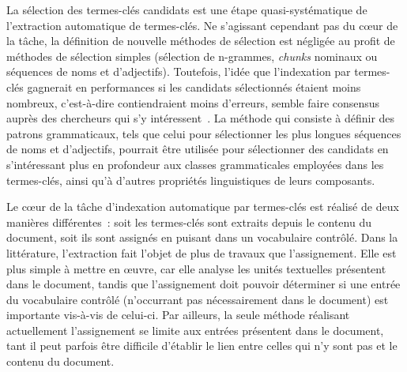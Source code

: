     La sélection des termes-clés candidats est une étape quasi-systématique de
    l'extraction automatique de termes-clés. Ne s'agissant cependant pas du
    c\oe{}ur de la tâche, la définition de nouvelle méthodes de sélection est
    négligée au profit de méthodes de sélection simples (sélection de n-grammes,
    \textit{chunks} nominaux ou séquences de noms et d'adjectifs). Toutefois,
    l'idée que l'indexation par termes-clés gagnerait en performances si les
    candidats sélectionnés étaient moins nombreux, c'est-à-dire contiendraient
    moins d'erreurs, semble faire consensus auprès des chercheurs qui s'y
    intéressent~\cite{huang2006semanticnetworkstructureanalysis,wang2014keyphraseextractionpreprocessing}. La méthode qui
    consiste à définir des patrons grammaticaux, tels que celui pour
    sélectionner les plus longues séquences de noms et d'adjectifs, pourrait
    être utilisée pour sélectionner des candidats en s'intéressant plus en
    profondeur aux classes grammaticales employées dans les termes-clés, ainsi
    qu'à d'autres propriétés linguistiques de leurs composants.

    Le c\oe{}ur de la tâche d'indexation automatique par termes-clés est
    réalisé de deux manières différentes~: soit les termes-clés sont extraits
    depuis le contenu du document, soit ils sont assignés en puisant dans un
    vocabulaire contrôlé. Dans la littérature, l'extraction fait l'objet de plus
    de travaux que l'assignement. Elle est plus simple à mettre en \oe{}uvre,
    car elle analyse les unités textuelles présentent dans le document, tandis
    que l'assignement doit pouvoir déterminer si une entrée du vocabulaire
    contrôlé (n'occurrant pas nécessairement dans le document) est importante
    vis-à-vis de celui-ci. Par ailleurs, la seule méthode réalisant actuellement
    l'assignement se limite aux entrées présentent dans le document, tant il
    peut parfois être difficile d'établir le lien entre celles qui n'y sont pas
    et le contenu du document.

